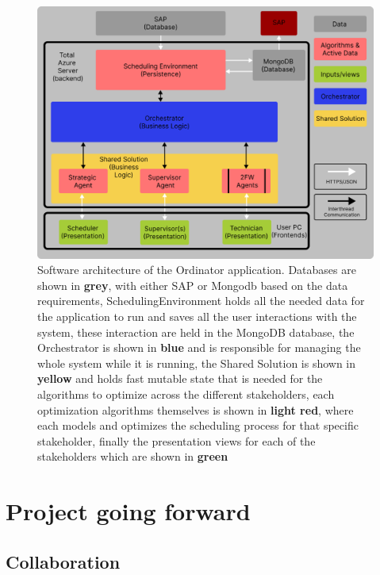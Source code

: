 \documentclass{article}
\begin{document}
\begin{figure}[H]
    \includegraphics[width=\textwidth]{../../../figures/architecture/ordinator-architecture.png}
    \caption{Software architecture of the Ordinator application. Databases are shown in
    \textbf{grey}, with either SAP or Mongodb based on the data requirements, SchedulingEnvironment
    holds all the needed data for the application to run and saves all the user interactions with
    the system, these interaction are held in the MongoDB database, the Orchestrator is
    shown in \textbf{blue} and is responsible for managing the whole system while it is running,
    the Shared Solution is
    shown in \textbf{yellow} and holds fast mutable state that is needed for the algorithms to optimize
    across the different stakeholders, each optimization algorithms themselves is shown in \textbf{light red},
    where each models and optimizes the scheduling process for that specific stakeholder, finally
    the presentation views for each of the stakeholders which are shown in \textbf{green} }
\end{figure}

\section{Project going forward}

\subsection{Collaboration}
\end{document}
